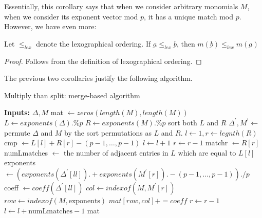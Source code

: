 Essentially, this corollary says that
when we consider arbitrary monomials \(M\),
when we consider its exponent vector 
mod \(p\), it has a unique
match mod \(p\).
However, we have even more:

\begin{cor}
	\label{cor:match:order}
	Let \(\leq_{lex}\) denote the 
	lexographical ordering.
	If \(\underbar{a} \leq_{lex} \underbar{b}\),
	then 
	\(m(\underbar{b}) \leq_{lex} m(\underbar{a})\)
\end{cor}

\begin{proof}
	Follows from the definition of lexographical
	ordering.
\end{proof}

The previous two corollaries justify
the following algorithm.

\begin{algorithm}
\caption{Multiply than split: merge-based algorithm}
\label{alg:theta:merge}
\begin{algorithmic}[1]
\State \textbf{Inputs:} \(\Delta, M\)
\State mat \(\gets zeros(length(M), length(M))\) 
\State \(L \gets exponents(\Delta) .\% p\) 
\State \(R \gets exponents(M) .\% p\)
\State sort both  \(L\) and \(R\) 
\State \(\Delta^{\prime}, M^{\prime} \gets \)permute \(\Delta\) and \(M\) by the sort permutations as \(L\) and \(R\).
\State \(l \gets 1, r \gets legnth(R)\)
	\State cmp \(\gets L[l] + R[r] - (p-1, \ldots, p-1)\) 
	    \State \(l \gets l + 1\) 
	    \State \(r \gets r - 1\)
        \State matchr \(\gets R[r]\) 
        \State numLmatches \(\gets\) the number of adjacent entries in \(L\) which are equal to \(L[l]\) 
                \State exponents \(\gets (exponents(\Delta^{\prime}[ll]) .+ exponents(M^{\prime}[r]) .- (p-1, \ldots, p-1)) ./ p\) 
                \State coeff \(\gets coeff(\Delta^{\prime}[ll])\)
                \State \(col \gets indexof(M,M^{\prime}[r])\)
                \State \(row \gets indexof(M, \text{exponents})\)
                \State \(mat[row,col] += coeff\) 
            \EndFor
            \State \(r \gets r - 1\)
        \EndWhile     
        \State \(l \gets l + \text{numLmatches} - 1\) 
    \EndIf
\EndWhile
\State \Return mat
\end{algorithmic}
\end{algorithm}

